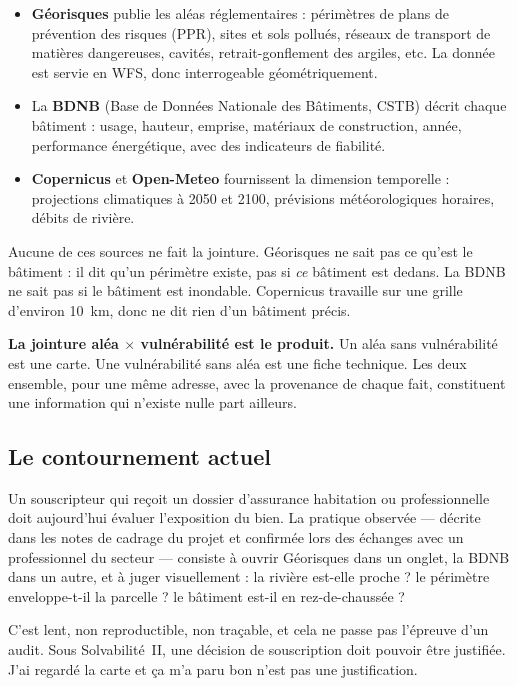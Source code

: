 \begin{itemize}[leftmargin=1.4em]
  \item \textbf{Géorisques} publie les aléas réglementaires : périmètres de
        plans de prévention des risques (PPR), sites et sols pollués, réseaux
        de transport de matières dangereuses, cavités, retrait-gonflement des
        argiles, etc. La donnée est servie en WFS, donc interrogeable
        géométriquement.
  \item La \textbf{BDNB} (Base de Données Nationale des Bâtiments, CSTB) décrit
        chaque bâtiment : usage, hauteur, emprise, matériaux de construction,
        année, performance énergétique, avec des indicateurs de fiabilité.
  \item \textbf{Copernicus} et \textbf{Open-Meteo} fournissent la dimension
        temporelle : projections climatiques à 2050 et 2100, prévisions
        météorologiques horaires, débits de rivière.
\end{itemize}

Aucune de ces sources ne fait la jointure. Géorisques ne sait pas ce qu'est le
bâtiment : il dit qu'un périmètre existe, pas si \emph{ce} bâtiment est dedans.
La BDNB ne sait pas si le bâtiment est inondable. Copernicus travaille sur une
grille d'environ 10~km, donc ne dit rien d'un bâtiment précis.

\begin{encadre}
\textbf{La jointure aléa $\times$ vulnérabilité est le produit.} Un aléa sans
vulnérabilité est une carte. Une vulnérabilité sans aléa est une fiche
technique. Les deux ensemble, pour une même adresse, avec la provenance de
chaque fait, constituent une information qui n'existe nulle part ailleurs.
\end{encadre}

\subsection{Le contournement actuel}

Un souscripteur qui reçoit un dossier d'assurance habitation ou professionnelle
doit aujourd'hui évaluer l'exposition du bien. La pratique observée — décrite
dans les notes de cadrage du projet et confirmée lors des échanges avec un
professionnel du secteur — consiste à ouvrir Géorisques dans un onglet, la BDNB
dans un autre, et à juger visuellement : la rivière est-elle proche ? le
périmètre enveloppe-t-il la parcelle ? le bâtiment est-il en rez-de-chaussée ?

C'est lent, non reproductible, non traçable, et cela ne passe pas l'épreuve
d'un audit. Sous Solvabilité~II, une décision de souscription doit pouvoir être
justifiée. \og J'ai regardé la carte et ça m'a paru bon \fg{} n'est pas une
justification.

